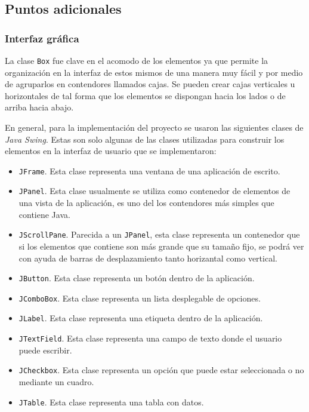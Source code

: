 \subsection*{Puntos adicionales}

\subsubsection*{Interfaz gráfica}

La clase \texttt{Box} fue clave en el acomodo de los elementos ya que permite la organización en la interfaz de estos mismos
de una manera muy fácil y por medio de agruparlos en contendores llamados cajas. Se pueden crear cajas verticales u
horizontales de tal forma que los elementos se dispongan hacia los lados o de arriba hacia abajo.

En general, para la implementación del proyecto se usaron las siguientes clases de \textit{Java Swing}. Estas son solo 
algunas de las clases utilizadas para construir los elementos en la interfaz de usuario que se implementaron:

\begin{itemize}
    \item \texttt{JFrame}. Esta clase representa una ventana de una aplicación de escrito.
    \item \texttt{JPanel}. Esta clase usualmente se utiliza como contenedor de elementos de una vista de la aplicación, es uno 
    del los contendores más simples que contiene Java.
    \item \texttt{JScrollPane}. Parecida a un \texttt{JPanel}, esta clase representa un contenedor que si los elementos que contiene
    son más grande que su tamaño fijo, se podrá ver con ayuda de barras de desplazamiento tanto horizantal como vertical.
    \item \texttt{JButton}. Esta clase representa un botón dentro de la aplicación. 
    \item \texttt{JComboBox}. Esta clase representa un lista desplegable de opciones.
    \item \texttt{JLabel}. Esta clase representa una etiqueta dentro de la aplicación.
    \item \texttt{JTextField}. Esta clase representa una campo de texto donde el usuario puede escribir.
    \item \texttt{JCheckbox}. Esta clase representa un opción que puede estar seleccionada o no mediante un cuadro.
    \item \texttt{JTable}. Esta clase representa una tabla con datos.
\end{itemize}

